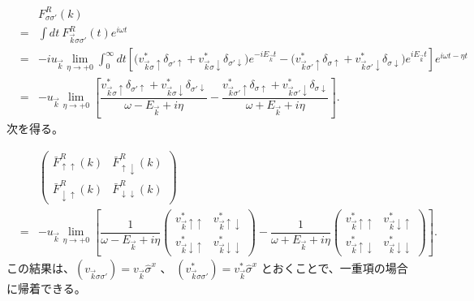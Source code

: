 \documentclass[uplatex,a4j,12pt,dvipdfmx]{jsarticle}
\begin{document}
\begin{eqnarray}
	&&
	F_{\sigma \sigma'}^{R}(k)
	\nonumber \\[4mm] &=&
	\int \! dt \ F_{\vec{k} \sigma \sigma'}^{R}(t) e^{i \omega t}
	\nonumber \\[4mm] &=&
	-
	i
	u_{\vec{k}}
	\lim_{\eta \to +0}
	\int^{\infty}_{0} \!\! dt
	\left[
		\Big(
		v_{\vec{k} \sigma \uparrow}^{*}
		\delta_{\sigma' \uparrow}
		+
		v_{\vec{k} \sigma \downarrow}^{*}
		\delta_{\sigma' \downarrow}
		\Big)
		e^{ - i E_{\vec{k}} t }
		-
		\Big(
		v_{\vec{k} \sigma' \uparrow}^{*}
		\delta_{\sigma \uparrow}
		+
		v_{\vec{k} \sigma' \downarrow}^{*}
		\delta_{\sigma \downarrow}
		\Big)
		e^{ i E_{\vec{k}} t }
		\right]
	e^{i \omega t - \eta t}
	\nonumber \\[4mm] &=&
	-
	u_{\vec{k}}
	\lim_{\eta \to +0}
	\left[
		\dfrac{
			v_{\vec{k} \sigma \uparrow}^{*}
			\delta_{\sigma' \uparrow}
			+
			v_{\vec{k} \sigma \downarrow}^{*}
			\delta_{\sigma' \downarrow}
		}{ \omega - E_{\vec{k}} + i \eta }
		-
		\dfrac{
			v_{\vec{k} \sigma' \uparrow}^{*}
			\delta_{\sigma \uparrow}
			+
			v_{\vec{k} \sigma' \downarrow}^{*}
			\delta_{\sigma \downarrow}
		}{ \omega + E_{\vec{k}} + i \eta }
		\right]
	.
\end{eqnarray}
%
次を得る。

\begin{eqnarray}
	&&
	\left(
	\begin{array}{cc}
			\bar{F}_{\uparrow \uparrow}^{R}(k)   & \bar{F}_{\uparrow \downarrow}^{R}(k)   \\[3mm]
			\bar{F}_{\downarrow \uparrow}^{R}(k) & \bar{F}_{\downarrow \downarrow}^{R}(k)
		\end{array}
	\right)
	\nonumber \\[4mm] &=&
	-
	u_{ \vec{k} }
	\lim_{\eta \to +0}
	\left[
		\dfrac{ 1 }{ \omega - E_{\vec{k}} + i \eta }
		\left(
		\begin{array}{cc}
				v_{\vec{k} \uparrow \uparrow}^{*}
				 &
				v_{\vec{k} \uparrow \downarrow}^{*}
				\\[3mm]
				v_{\vec{k} \downarrow \uparrow}^{*}
				 &
				v_{\vec{k} \downarrow \downarrow}^{*}
			\end{array}
		\right)
		-
		\dfrac{ 1 }{ \omega + E_{\vec{k}} + i \eta }
		\left(
		\begin{array}{cc}
				v_{\vec{k} \uparrow \uparrow}^{*}
				 &
				v_{\vec{k} \downarrow \uparrow}^{*}
				\\[3mm]
				v_{\vec{k} \uparrow \downarrow}^{*}
				 &
				v_{\vec{k} \downarrow \downarrow}^{*}
			\end{array}
		\right)
		\right]
	.
\end{eqnarray}
%
この結果は、$(v_{\vec{k} \sigma \sigma'}) = v_{\vec{k}} \hat{\sigma}^{x}$
、
$(v_{\vec{k} \sigma \sigma'}^{*}) = v_{\vec{k}}^{*} \hat{\sigma}^{x}$
とおくことで、一重項の場合に帰着できる。
\end{document}
